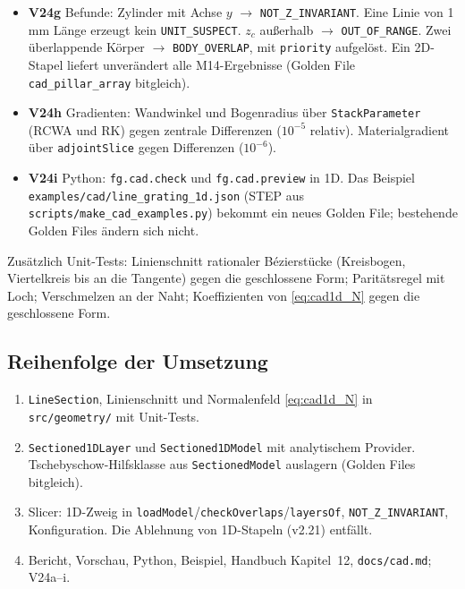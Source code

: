 \begin{itemize}[nosep]
        dem vereinigten Profil.
  \item \textbf{V24g} Befunde: Zylinder mit Achse $y$ $\to$ \verb|NOT_Z_INVARIANT|. Eine Linie von 1\,mm Länge erzeugt
        kein \verb|UNIT_SUSPECT|. $z_c$ außerhalb $\to$ \verb|OUT_OF_RANGE|. Zwei überlappende Körper $\to$
        \verb|BODY_OVERLAP|, mit \verb|priority| aufgelöst. Ein 2D-Stapel liefert unverändert alle M14-Ergebnisse
        (Golden File \verb|cad_pillar_array| bitgleich).
  \item \textbf{V24h} Gradienten: Wandwinkel und Bogenradius über \verb|StackParameter| (RCWA und RK) gegen zentrale
        Differenzen ($10^{-5}$ relativ). Materialgradient über \verb|adjointSlice| gegen Differenzen ($10^{-6}$).
  \item \textbf{V24i} Python: \verb|fg.cad.check| und \verb|fg.cad.preview| in 1D. Das Beispiel
        \verb|examples/cad/line_grating_1d.json| (STEP aus \verb|scripts/make_cad_examples.py|) bekommt ein neues Golden
        File; bestehende Golden Files ändern sich nicht.
\end{itemize}
Zusätzlich Unit-Tests: Linienschnitt rationaler Bézierstücke (Kreisbogen, Viertelkreis bis an die Tangente) gegen die
geschlossene Form; Paritätsregel mit Loch; Verschmelzen an der Naht; Koeffizienten von \eqref{eq:cad1d_N} gegen die
geschlossene Form.

\subsection{Reihenfolge der Umsetzung}
\begin{enumerate}[nosep]
  \item \verb|LineSection|, Linienschnitt und Normalenfeld \eqref{eq:cad1d_N} in \verb|src/geometry/| mit Unit-Tests.
  \item \verb|Sectioned1DLayer| und \verb|Sectioned1DModel| mit analytischem Provider. Tschebyschow-Hilfsklasse aus
        \verb|SectionedModel| auslagern (Golden Files bitgleich).
  \item Slicer: 1D-Zweig in \verb|loadModel|/\verb|checkOverlaps|/\verb|layersOf|, \verb|NOT_Z_INVARIANT|, Konfiguration.
        Die Ablehnung von 1D-Stapeln (v2.21) entfällt.
  \item Bericht, Vorschau, Python, Beispiel, Handbuch Kapitel~12, \verb|docs/cad.md|; V24a--i.
\end{enumerate}
